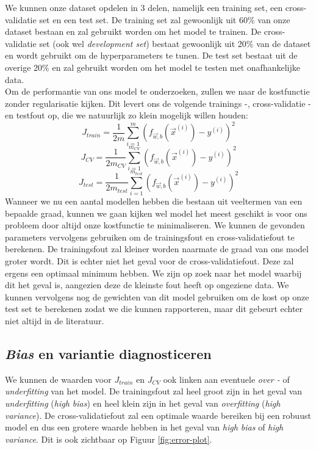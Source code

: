 We kunnen onze dataset opdelen in 3 delen, namelijk een training set, een cross-validatie set en een test set. De training set zal gewoonlijk uit 60$\%$ van onze dataset bestaan en zal gebruikt worden om het model te trainen. De cross-validatie set (ook wel \textit{development set}) bestaat gewoonlijk uit 20$\%$ van de dataset en wordt gebruikt om de hyperparameters te tunen. De test set bestaat uit de overige 20$\%$ en zal gebruikt worden om het model te testen met onafhankelijke data. \\
\newline
Om de performantie van ons model te onderzoeken, zullen we naar de kostfunctie zonder regularisatie kijken. Dit levert ons de volgende trainings -, cross-validatie - en testfout op, die we natuurlijk zo klein mogelijk willen houden:
\begin{equation}
	J_{train} = \frac{1}{2m} \sum_{i=1}^{m} (f_{\vec{w},b} (\vec{x}^{(i)}) - y^{(i)})^{2}
\end{equation}
\begin{equation}
	J_{CV} = \frac{1}{2m_{CV}} \sum_{i=1}^{m_{CV}} (f_{\vec{w},b} (\vec{x}^{(i)}) - y^{(i)})^{2}
\end{equation}
\begin{equation}
	J_{test} = \frac{1}{2m_{test}} \sum_{i=1}^{m_{test}} (f_{\vec{w},b} (\vec{x}^{(i)}) - y^{(i)})^{2}
\end{equation}
\noindent
Wanneer we nu een aantal modellen hebben die bestaan uit veeltermen van een bepaalde graad, kunnen we gaan kijken wel model het meest geschikt is voor ons probleem door altijd onze kostfunctie te minimaliseren. We kunnen de gevonden parameters vervolgens gebruiken om de trainingsfout en cross-validatiefout te berekenen. De trainingsfout zal kleiner worden naarmate de graad van ons model groter wordt. Dit is echter niet het geval voor de cross-validatiefout. Deze zal ergens een optimaal minimum hebben. We zijn op zoek naar het model waarbij dit het geval is, aangezien deze de kleinste fout heeft op ongeziene data. We kunnen vervolgens nog de gewichten van dit model gebruiken om de kost op onze test set te berekenen zodat we die kunnen rapporteren, maar dit gebeurt echter niet altijd in de literatuur. 

\subsection{\textit{Bias} en variantie diagnosticeren}

We kunnen de waarden voor $J_{train}$ en $J_{CV}$ ook linken aan eventuele \textit{over -} of \textit{underfitting} van het model. De trainingsfout zal heel groot zijn in het geval van \textit{underfitting} (\textit{high bias}) en heel klein zijn in het geval van \textit{overfitting} (\textit{high variance}). De cross-validatiefout zal een optimale waarde bereiken bij een robuust model en dus een grotere waarde hebben in het geval van \textit{high bias} of \textit{high variance}. Dit is ook zichtbaar op Figuur \ref{fig:error-plot}.

